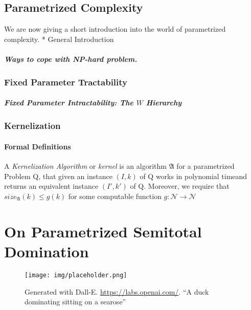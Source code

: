 
\section{Parametrized Complexity}
We are now giving a short introduction into the world of parametrized complexity. 
* General Introduction
\paragraph{Ways to cope with NP-hard problem.}

\subsection{Fixed Parameter Tractability}
\paragraph{Fixed Parameter Intractability: The \hmath $W$ Hierarchy}

\subsection{Kernelization}
\subsubsection{Formal Definitions}
\begin{definition}
A \textit{Kernelization Algorithm} or \textit{kernel} is an algorithm $\mathfrak{A}$ for a parametrized Problem Q, that given an instance $(I,k)$ of Q works in polynomial timeand returns an equivalent instance $(I', k')$ of Q. Moreover, we require that $size_{\mathfrak{A}}(k) \leq g(k)$ for some computable function $g:\mathcal{N} \rightarrow \mathcal{N}$
\end{definition}


\chapter{On Parametrized Semitotal Domination}

\vspace*{-50pt}

\begin{figure}[ht]
        \texttt{[image: img/placeholder.png]}
        \captionsetup{textformat=empty,labelformat=blank}
        \caption{Generated with Dall-E. \url{https://labs.openai.com/}. ``A duck dominating sitting on a searose''}
\end{figure}


